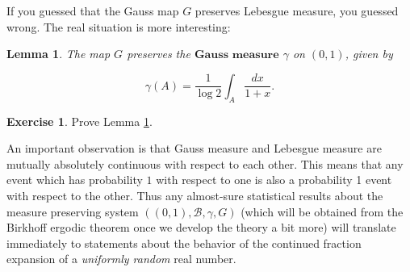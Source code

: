 \documentclass[11pt]{report}
\theoremstyle{plain}
\newtheorem{lem}[thm]{Lemma}
\theoremstyle{definition}
\newtheorem{xexercise}[thm]{Exercise}
\begin{document}
\begin{enumerate}[label=\arabic*.]
If you guessed that the Gauss map $G$ preserves Lebesgue measure, you guessed wrong. The real situation is more interesting:

\begin{lem}
\label{lem-gauss-measure}
The map $G$ preserves the $\textbf{Gauss measure}$ $\gamma$ on $(0,1)$, given by

\[
\gamma(A) = \frac{1}{\log 2} \int_A \frac{dx}{1+x}.
\]

\end{lem}

\begin{xexercise}
Prove Lemma \ref{lem-gauss-measure}.
\end{xexercise}

An important observation is that Gauss measure and Lebesgue measure are mutually absolutely continuous with respect to each other. This means that any event which has probability $1$ with respect to one is also a probability 1 event with respect to the other. Thus any almost-sure statistical results about the measure preserving system $((0,1),\mathcal{B},\gamma,G)$ (which will be obtained from the Birkhoff ergodic theorem once we develop the theory a bit more) will translate immediately to statements about the behavior of the continued fraction expansion of a \emph{uniformly random} real number.


\end{enumerate}
\end{document}
